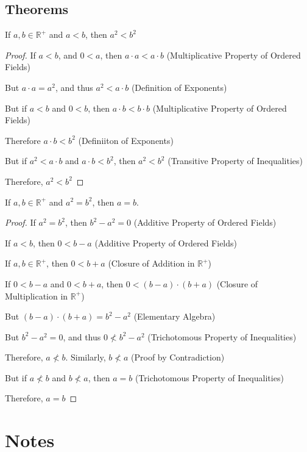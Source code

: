 \documentclass[crop=false,class=book]{standalone}
\begin{document}
\subsection{Theorems}
\begin{theorem}
    \label{Theorem:MathEnc:Analysis:Sum:SqurPresIneqPosNum}
    If $a,b\in\mathbb{R}^{+}$ and $a<b$, then $a^{2}<b^{2}$
\end{theorem}
\begin{proof}
    If $a<b$, and $0<a$, then $a\cdot a<a\cdot b$
    \hfill
    (Multiplicative Property of Ordered Fields)\par
    But $a\cdot a = a^{2}$, and thus $a^{2}<a\cdot b$
    \hfill
    (Definition of Exponents)\par
    But if $a<b$ and $0<b$, then $a\cdot b<b\cdot b$
    \hfill
    (Multiplicative Property of Ordered Fields)\par
    Therefore $a\cdot b<b^{2}$
    \hfill
    (Definiiton of Exponents)\par
    But if $a^{2}<a\cdot b$ and $a\cdot b<b^{2}$, then $a^{2}<b^{2}$
    \hfill
    (Transitive Property of Inequalities)\par
    Therefore, $a^{2}<b^{2}$
\end{proof}
\begin{theorem}
    If $a,b\in\mathbb{R}^{+}$ and $a^{2}=b^{2}$, then $a=b$.
\end{theorem}
\begin{proof}
    If $a^{2}=b^{2}$, then $b^{2}-a^{2}=0$\hfill
    (Additive Property of Ordered Fields)\par
    If $a<b$, then $0<b-a$\hfill
    (Additive Property of Ordered Fields)\par
    If $a,b\in\mathbb{R}^{+}$, then $0<b+a$
    \hfill
    (Closure of Addition in $\mathbb{R}^{+}$)\par
    If $0<b-a$ and $0<b+a$, then $0<(b-a)\cdot (b+a)$
    \hfill
    (Closure of Multiplication in $\mathbb{R}^{+}$)\par
    But $(b-a)\cdot(b+a)=b^{2}-a^{2}$
    \hfill
    (Elementary Algebra)\par
    But $b^{2}-a^{2}=0$, and thus $0\not<b^{2}-a^{2}$
    \hfill
    (Trichotomous Property of Inequalities)\par
    Therefore, $a\not<b$. Similarly, $b\not<a$
    \hfill
    (Proof by Contradiction)\par
    But if $a\not<b$ and $b\not<a$, then $a=b$
    \hfill
    (Trichotomous Property of Inequalities)\par
    Therefore, $a=b$
\end{proof}
\clearpage
\section{Notes}
\end{document}
